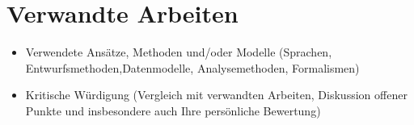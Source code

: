 \chapter{Verwandte Arbeiten}
\label{ch:relatedwork}

\begin{itemize}
	\item Verwendete Ansätze, Methoden und/oder Modelle (Sprachen, Entwurfsmethoden,Datenmodelle, Analysemethoden, Formalismen)
	\item Kritische Würdigung (Vergleich mit verwandten Arbeiten, Diskussion offener Punkte und insbesondere auch Ihre persönliche Bewertung)
\end{itemize}
